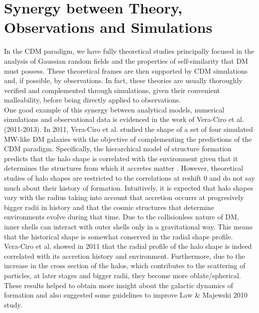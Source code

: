 \section{Synergy between Theory, Observations and Simulations }
In the CDM paradigm, we have fully theoretical studies \cite{Bardeen et al. 1986,Schechter} principally focused in the analysis of Gaussian random fields and the properties of self-similarity that DM must possess. 
These theoretical frames are then supported by CDM simulations \cite{Cualquier estudio de CDM hace referencia a esos pilares} and, if possible, by observations. 
In fact, these theories are usually thoroughly verified and complemented through simulations, given their convenient malleability, before being directly applied to observations.\\%

One good example of this synergy between analytical models, numerical simulations and observational data is evidenced in the work of Vera-Ciro et al. (2011-2013). In 2011, Vera-Ciro et al. studied the shape of a set of four simulated MW-like DM galaxies with the objective of complementing the predictions of the CDM paradigm. Specifically, the hierarchical model of structure formation predicts that the halo shape is correlated with the environment given that it determines the structures from which it accretes matter \cite{referencias sobre relacion entre forma y entorno}. However, theoretical studies of halo shapes are restricted to the correlations at reshift 0 and do not say much about their history of formation. Intuitively, it is expected that halo shapes vary with the radius taking into account that accretion occurrs at progresively bigger radii in history and that the cosmic structures that determine environments evolve during that time. Due to the collisionless nature of DM, inner shells can interact with outer shells only in a gravitational way. This means that the historical shape is somewhat conserved in the radial shape profile.\\

Vera-Ciro et al.  showed in 2011 that the radial profile of the halo shape is indeed correlated with its accretion history and environment. Furthermore, due to the increase in the cross section of the halos, which contributes to the scattering of particles, at later stages and bigger radii, they become more oblate/spherical. These results helped to obtain more insight about the galactic dynamics of formation and also suggested some guidelines to improve Law \& Majewski 2010 study.\\

